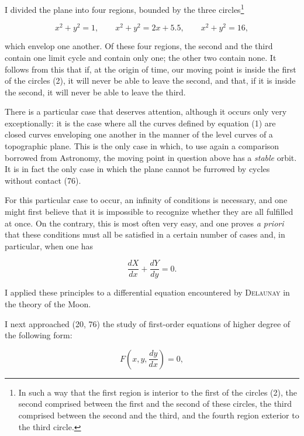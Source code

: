\documentclass[11pt]{article}
\begin{document}
I divided the plane into four regions, bounded by the three circles\footnote[1]{In such a way that the first region is interior to the first of the circles (2), the second comprised between the first and the second of these circles, the third comprised between the second and the third, and the fourth region exterior to the third circle.}

\begin{equation*}
 x^2+y^2=1,\qquad x^2+y^2=2x+5.5,\qquad x^2+y^2=16,
\tag{2}
\end{equation*}

which envelop one another. Of these four regions, the second and the third contain one limit cycle and contain only one; the other two contain none. It follows from this that if, at the origin of time, our moving point is inside the first of the circles (2), it will never be able to leave the second, and that, if it is inside the second, it will never be able to leave the third.

There is a particular case that deserves attention, although it occurs only very exceptionally: it is the case where all the curves defined by equation (1) are closed curves enveloping one another in the manner of the level curves of a topographic plane. This is the only case in which, to use again a comparison borrowed from Astronomy, the moving point in question above has a \emph{stable} orbit. It is in fact the only case in which the plane cannot be furrowed by cycles without contact (76).

For this particular case to occur, an infinity of conditions is necessary, and one might first believe that it is impossible to recognize whether they are all fulfilled at once. On the contrary, this is most often very easy, and one proves \emph{a priori} that these conditions must all be satisfied in a certain number of cases and, in particular, when one has

\[
\frac{dX}{dx}+\frac{dY}{dy}=0.
\]

I applied these principles to a differential equation encountered by \textsc{Delaunay} in the theory of the Moon.

I next approached (20, 76) the study of first-order equations of higher degree of the following form:

\begin{equation*}
F\left(x,y,\frac{dy}{dx}\right)=0,
\tag{3}
\end{equation*}
\end{document}
